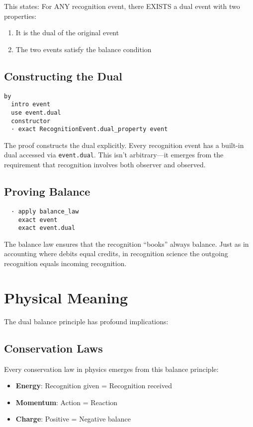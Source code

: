 \documentclass[11pt]{article}
\theoremstyle{definition}
\begin{document}
This states: For ANY recognition event, there EXISTS a dual event with two properties:
\begin{enumerate}
    \item It is the dual of the original event
    \item The two events satisfy the balance condition
\end{enumerate}

\subsection{Constructing the Dual}
\begin{verbatim}
by
  intro event
  use event.dual
  constructor
  · exact RecognitionEvent.dual_property event
\end{verbatim}

The proof constructs the dual explicitly. Every recognition event has a built-in dual accessed via \texttt{event.dual}. This isn't arbitrary—it emerges from the requirement that recognition involves both observer and observed.

\subsection{Proving Balance}
\begin{verbatim}
  · apply balance_law
    exact event
    exact event.dual
\end{verbatim}

The balance law ensures that the recognition ``books'' always balance. Just as in accounting where debits equal credits, in recognition science the outgoing recognition equals incoming recognition.

\section{Physical Meaning}

The dual balance principle has profound implications:

\subsection{Conservation Laws}
Every conservation law in physics emerges from this balance principle:
\begin{itemize}
    \item \textbf{Energy}: Recognition given = Recognition received
    \item \textbf{Momentum}: Action = Reaction
    \item \textbf{Charge}: Positive = Negative balance
\end{itemize}
\end{document}
